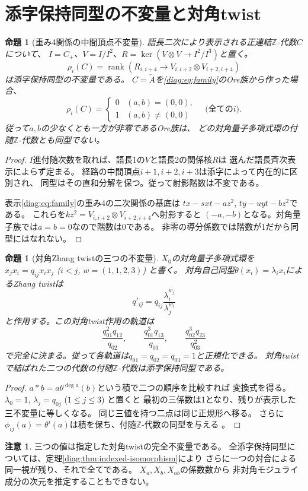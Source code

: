 \documentclass[11pt,a4paper]{ltjsarticle}
\newtheorem{proposition}[theorem]{命題}
\theoremstyle{definition}
\newtheorem{remark}[theorem]{注意}
\newcommand{\rk}{\operatorname{rank}}
\newcommand{\ZZ}{\mathbb Z}
\begin{document}
\section{添字保持同型の不変量と対角twist}
\begin{proposition}[重み4関係の中間頂点不変量]\label{diag:prop:rho}
語長二次により表示される正連結$\ZZ$-代数$C$について、
$I=C_+$、$V=I/I^2$、$R=\ker(V\otimes V\to I^2/I^3)$と置く。
\[
\rho_i(C)=\rk\left(R_{i,i+4}\longrightarrow
V_{i,i+2}\otimes V_{i+2,i+4}\right)
\]
は添字保持同型の不変量である。
$C=\check A$を\eqref{diag:eq:family}のOre族から作った場合、
\[
\rho_i(C)=\begin{cases}0&(a,b)=(0,0),\\1&(a,b)\ne(0,0)
\end{cases}
\quad\text{(全ての$i$)}.
\]
従って$a,b$の少なくとも一方が非零であるOre族は、
どの対角量子多項式環の付随$\ZZ$-代数とも同型でない。
\end{proposition}
\begin{proof}
$I$進付随次数を取れば、語長1の$V$と語長2の関係核$R$は
選んだ語長斉次表示によらず定まる。
経路の中間頂点$i+1,i+2,i+3$は添字によって内在的に区別され、
同型はその直和分解を保つ。従って射影階数は不変である。

表示\eqref{diag:eq:family}の重み4の二次関係の基底は
$tx-sxt-az^2$, $ty-uyt-bz^2$である。
これらを$kz^2=V_{i,i+2}\otimes V_{i+2,i+4}$へ射影すると
$(-a,-b)$となる。対角量子族では$a=b=0$なので階数は0である。
非零の導分係数では階数が1だから同型にはなれない。
\end{proof}

\begin{proposition}[対角Zhang twistの三つの不変量]\label{diag:prop:twist}
$X_0$の対角量子多項式環を
$x_jx_i=q_{ij}x_ix_j$ ($i<j$, $w=(1,1,2,3)$) と書く。
対角自己同型$\theta(x_i)=\lambda_i x_i$によるZhang twistは
\[q'_{ij}=q_{ij}\frac{\lambda_i^{w_j}}{\lambda_j^{w_i}}\]
と作用する。この\emph{対角twist作用}の軌道は
\[
\frac{q_{01}^2q_{12}}{q_{02}},\qquad
\frac{q_{01}^3q_{13}}{q_{03}},\qquad
\frac{q_{02}^3q_{23}}{q_{03}^2}
\]
で完全に決まる。従って各軌道は$q_{01}=q_{02}=q_{03}=1$と正規化できる。
対角twistで結ばれた二つの代数の付随$\ZZ$-代数は添字保持同型である。
\end{proposition}
\begin{proof}
$a*b=a\theta^{\deg a}(b)$という積で二つの順序を比較すれば
変換式を得る。$\lambda_0=1$, $\lambda_j=q_{0j}$ ($1\leq j\leq3$) と置くと
最初の三係数は1となり、残りが表示した三不変量に等しくなる。
同じ三値を持つ二点は同じ正規形へ移る。
さらに$\phi_{ij}(a)=\theta^i(a)$は積を保ち、付随$\ZZ$-代数の同型を与える
\cite{Sierra}。
\end{proof}
\begin{remark}
三つの値は指定した対角twistの完全不変量である。
全添字保持同型については、定理\ref{diag:thm:indexed-isomorphism}により
さらに一つの対合による同一視が残り、それで全てである。
$X_a,X_b,X_{ab}$の係数数から
非対角モジュライ成分の次元を推定することもできない。
\end{remark}
\end{document}

